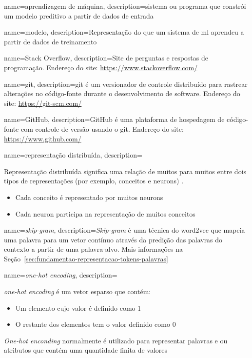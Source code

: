 {
    name=aprendizagem de máquina,
    description={sistema ou programa que constrói um modelo preditivo a partir de dados de entrada \citep{glossary-ml}}
}

{
    name=modelo,
    description={Representação do que um sistema de \gls{ml} aprendeu a partir de dados de treinamento \citep{glossary-ml}}
}

{
    name=Stack Overflow,
    description={Site de perguntas e respostas de programação. Endereço do site: \url{https://www.stackoverflow.com/}}
}

{
    name=git,
    description={git é um versionador de controle distribuído para rastrear alterações no código-fonte durante o desenvolvimento de software. Endereço do site: \url{https://git-scm.com/} \citep{wikipedia-git-2019}}
}

{
    name=GitHub,
    description={GitHub é uma plataforma de hospedagem de código-fonte com controle de versão usando o \gls{git}. Endereço do site: \url{https://www.github.com/}}
}

{
    name=representação distribuída,
    description={Representação distribuída significa uma relação de muitos para muitos entre dois tipos de representações (por exemplo, conceitos e \gls{neuron}s) \citep{Hinton-distributed-representatons:1986}. 
    \begin{itemize}
        \item Cada conceito é representado por muitos \gls{neuron}s
        \item Cada \gls{neuron} participa na representação de muitos conceitos
    \end{itemize}
    }
}

{
    name=\textit{skip-gram},
    description={\textit{Skip-gram} é uma técnica do \gls{word2vec} que mapeia uma palavra para um vetor contínuo através da predição das palavras do contexto a partir de uma palavra-alvo. Mais informações na Seção~\ref{sec:fundamentao-representacao-tokens-palavras}
    }
}

{
    name=\textit{one-hot encoding},
    description={\textit{one-hot encoding} é um vetor esparso que contém:
    \begin{itemize}
        \item Um elemento cujo valor é definido como 1
        \item O restante dos elementos tem o valor definido como 0
    \end{itemize}
    \textit{One-hot enconding} normalmente é utilizado para representar palavras e ou atributos que contém uma quantidade finita de valores \citep{glossary-ml}
    }
}

